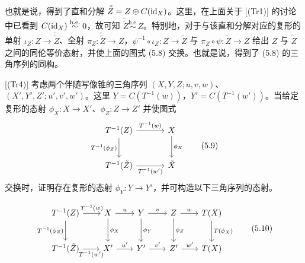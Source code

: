 也就是说，得到了直和分解 $\tilde{\tilde Z} = Z\oplus C(\mathrm{id}_X)$。这里，在上面关于 [(Tr1)] 的讨论中已看到 $C(\mathrm{id}_X)\overset{\mathrm{h.e.}}{\sim}0$，故可知 $\tilde{\tilde Z}\overset{\mathrm{h.e.}}{\sim}Z$。特别地，对于与该直和分解对应的复形的单射 $\iota_Z\colon Z\to\tilde{\tilde Z}$、全射 $\pi_Z\colon\tilde{\tilde Z}\to Z$，$\psi^{-1}\circ\iota_Z\colon Z\to\tilde Z$ 与 $\pi_Z\circ\psi\colon\tilde Z\to Z$ 给出 $Z$ 与 $\tilde Z$ 之间的同伦等价态射，并使上面的图式 (5.8) 交换。也就是说，得到了 (5.8) 的三角序列的同构。

[(Tr4)] 考虑两个伴随写像锥的三角序列 $(X,Y,Z;u,v,w)$、$(X',Y',Z';u',v',w')$。这里 $Y=C(T^{-1}(w))$，$Y'=C(T^{-1}(w'))$。当给定复形的态射 $\phi_X\colon X\to X'$、$\phi_Z\colon Z\to Z'$ 并使图式
\begin{equation}
\begin{tikzcd}[row sep=2.4em, column sep=3.4em]
T^{-1}(Z) \arrow[r,"T^{-1}(w)"] \arrow[d,"T^{-1}(\phi_Z)"'] & X \arrow[d,"\phi_X"] \\
T^{-1}(\tilde Z) \arrow[r,"T^{-1}(w')"'] & \tilde X
\end{tikzcd} \tag{5.9}
\end{equation}
交换时，证明存在复形的态射 $\phi_Y\colon Y\to Y'$，并可构造以下三角序列的态射。


\begin{equation}
\begin{tikzcd}[row sep=2.4em, column sep=2.0em]
T^{-1}(Z) \arrow[r,"T^{-1}(w)"] \arrow[d,"T^{-1}(\phi_Z)"'] & X \arrow[r,"u"] \arrow[d,"\phi_X"] & Y \arrow[r,"v"] \arrow[d,"\phi_Y"] & Z \arrow[r,"w"] \arrow[d,"\phi_Z"] & T(X) \arrow[d,"T(\phi_X)"] \\
T^{-1}(\tilde Z) \arrow[r,"T^{-1}(w')"'] & X' \arrow[r,"u'"] & Y' \arrow[r,"v'"] & Z' \arrow[r,"w'"] & T(X)
\end{tikzcd} \tag{5.10}
\end{equation}


